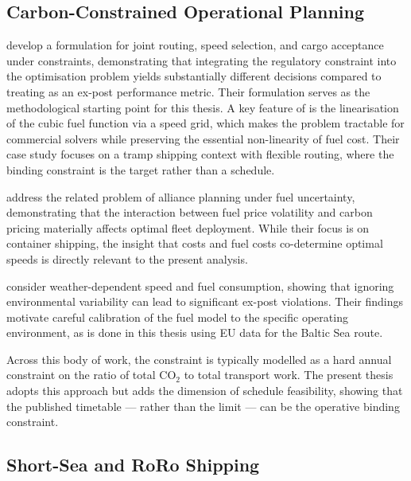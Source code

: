 \subsection{Carbon-Constrained Operational Planning}
\label{sec:lit:constrained}

\textcite{cheng2025cii} develop a \MILP{} formulation for joint routing,
speed selection, and cargo acceptance under \CII{} constraints,
demonstrating that integrating the regulatory constraint into the
optimisation problem yields substantially different decisions compared
to treating \CII{} as an ex-post performance metric. Their formulation
serves as the methodological starting point for this thesis.  A key feature
of \textcite{cheng2025cii} is the linearisation of the cubic fuel function
via a speed grid, which makes the problem tractable for commercial \MILP{}
solvers while preserving the essential non-linearity of fuel cost.  Their
case study focuses on a tramp shipping context with flexible routing, where
the binding constraint is the \CII{} target rather than a schedule.

\textcite{GuWangIris2025AllianceUncertainFuel} address the related problem of
alliance planning under fuel uncertainty, demonstrating that the interaction
between fuel price volatility and carbon pricing materially affects optimal
fleet deployment.  While their focus is on container shipping, the insight that
\ETS{} costs and fuel costs co-determine optimal speeds is directly relevant
to the present analysis.

\textcite{GolsefidiSharifiGhader2025WeatherSpeedFuel} consider weather-dependent
speed and fuel consumption, showing that ignoring environmental variability can
lead to significant ex-post \CII{} violations.  Their findings motivate careful
calibration of the fuel model to the specific operating environment, as is done
in this thesis using EU \MRV{} data for the Baltic Sea route.

Across this body of work, the \CII{} constraint is typically modelled as a hard
annual constraint on the ratio of total CO$_2$ to total transport work.  The
present thesis adopts this approach but adds the dimension of schedule
feasibility, showing that the published timetable --- rather than the \CII{}
limit --- can be the operative binding constraint.

\subsection{Short-Sea and RoRo Shipping}
\label{sec:lit:shortsea}

